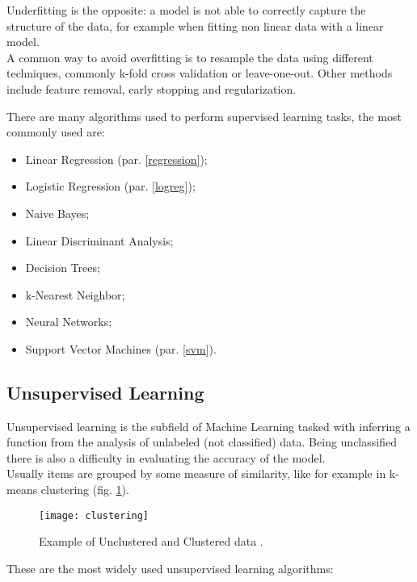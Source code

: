 \begin{itemize}
	Underfitting is the opposite: a model is not able to correctly capture the structure of the data, for example when fitting non linear data with a linear model. \\
	A common way to avoid overfitting is to resample the data using different techniques, commonly k-fold cross validation or leave-one-out. Other methods include feature removal, early stopping and regularization.
\end{itemize}

There are many algorithms used to perform supervised learning tasks, the most commonly used are:

\begin{itemize}[noitemsep, topsep = -5pt]
	\item Linear Regression (par. \ref{regression});
	\item Logistic Regression (par. \ref{logreg});
	\item Naive Bayes;
	\item Linear Discriminant Analysis;
	\item Decision Trees;
	\item k-Nearest Neighbor;
	\item Neural Networks;
	\item Support Vector Machines (par. \ref{svm}).
\end{itemize}

\subsection{Unsupervised Learning} \label{unsupervised}
Unsupervised learning is the subfield of Machine Learning tasked with inferring a function from the analysis of unlabeled (not classified) data. Being unclassified there is also a difficulty in evaluating the accuracy of the model.\\
Usually items are grouped by some measure of similarity, like for example in k-means clustering (fig. \ref{fig:clustering}).

\begin{figure}[H]
	\centering
	\texttt{[image: clustering]}
	\caption{Example of Unclustered and Clustered data \cite{kmeans}.}
	\label{fig:clustering}
\end{figure}	

These are the most widely used unsupervised learning algorithms:

